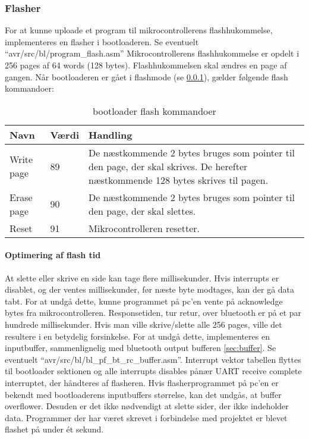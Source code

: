 \subsubsection{Flasher}
\label{sec:flasher}
For at kunne uploade et program til mikrocontrollerens flashhukommelse, implementeres en flasher i bootloaderen.
Se eventuelt \mbox{``avr/src/bl/program\_flash.asm''}
Mikrocontrollerens flashhukommelse er opdelt i 256 pages af 64 words (128 bytes). Flashhukommelsen skal ændres en page af gangen.
Når bootloaderen er gået i flashmode (se \ref{sec:flasher}), gælder følgende flash kommandoer:
\begin{table}[H]
	\caption{bootloader flash kommandoer}
	\label{tab:blflashcommands}
	\centering
	\begin{tabular}{|l|l|p{13cm}|}
		\hline
		\textbf{Navn} & \textbf{Værdi} & \textbf{Handling} \\
		\hline
		Write page & 89 & De næstkommende 2 bytes bruges som pointer til den page, der skal skrives. De herefter næstkommende 128 bytes skrives til pagen.\\
		\hline
		Erase page & 90 & De næstkommende 2 bytes bruges som pointer til den page, der skal slettes.\\
		\hline
		Reset & 91 & Mikrocontrolleren resetter.\\
		\hline
	\end{tabular}
\end{table}
\paragraph{Optimering af flash tid}
At slette eller skrive en side kan tage flere millisekunder. Hvis interrupts er disablet, og der ventes millisekunder, før næste byte modtages, kan der gå data tabt. For at undgå dette, kunne programmet på pc'en vente på acknowledge bytes fra mikrocontrolleren. Responsetiden, tur retur, over bluetooth er på et par hundrede millisekunder. Hvis man ville skrive/slette alle 256 pages, ville det resultere i en betydelig forsinkelse.
For at undgå dette, implementeres en inputbuffer, sammenlignelig med bluetooth output bufferen \ref{sec:buffer}. Se eventuelt \mbox{``avr/src/bl/bl\_pf\_bt\_rc\_buffer.asm''}. Interrupt vektor tabellen flyttes til bootloader sektionen og alle interrupts disables pånær UART receive complete interruptet, der håndteres af flasheren. Hvis flasherprogrammet på pc'en er bekendt med bootloaderens inputbuffers størrelse, kan det undgås, at buffer overflower. Desuden er det ikke nødvendigt at slette sider, der ikke indeholder data. Programmer der har været skrevet i forbindelse med projektet er blevet flashet på under ét sekund.
